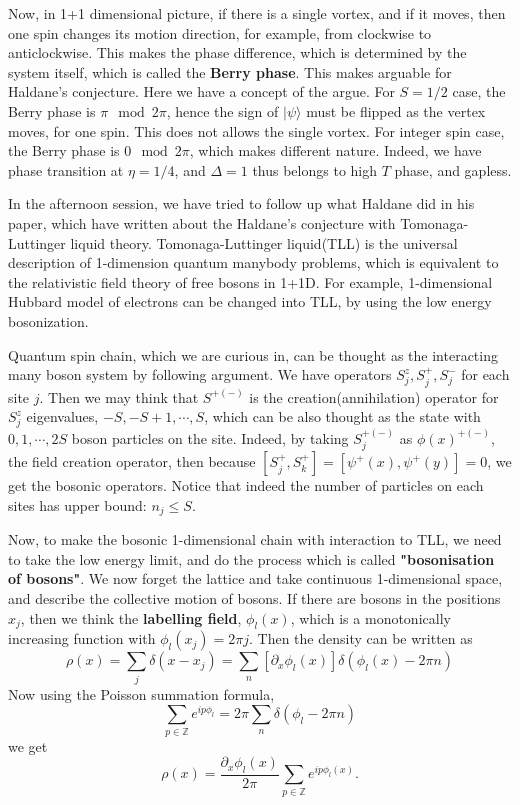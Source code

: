 Now, in 1+1 dimensional picture, if there is a single vortex, and if it moves, then one spin changes its motion direction, for example, from clockwise to anticlockwise. This makes the phase difference, which is determined by the system itself, which is called the \textbf{Berry phase}. This makes arguable for Haldane's conjecture. Here we have a concept of the argue. For $S=1/2$ case, the Berry phase is $\pi \mod 2\pi$, hence the sign of $|\psi\rangle$ must be flipped as the vertex moves, for one spin. This does not allows the single vortex. For integer spin case, the Berry phase is $0 \mod 2\pi$, which makes different nature. Indeed, we have phase transition at $\eta=1/4$, and $\Delta=1$ thus belongs to high $T$ phase, and gapless.

In the afternoon session, we have tried to follow up what Haldane did in his paper, which have written about the Haldane's conjecture with Tomonaga-Luttinger liquid theory. Tomonaga-Luttinger liquid(TLL) is the universal description of 1-dimension quantum manybody problems, which is equivalent to the relativistic field theory of free bosons in 1+1D. For example, 1-dimensional Hubbard model of electrons can be changed into TLL, by using the low energy bosonization.

Quantum spin chain, which we are curious in, can be thought as the interacting many boson system by following argument. We have operators $S_j^z, S_j^+, S_j^-$ for each site $j$. Then we may think that $S^{+(-)}$ is the creation(annihilation) operator for $S_j^z$ eigenvalues, $-S, -S+1,\cdots,S$, which can be also thought as the state with $0,1,\cdots,2S$ boson particles on the site. Indeed, by taking $S_j^{+(-)}$ as $\phi(x)^{+(-)}$, the field creation operator, then because $[S_j^+,S_k^+]=[\psi^+(x),\psi^+(y)]=0$, we get the bosonic operators. Notice that indeed the number of particles on each sites has upper bound: $n_j\leq S$.

Now, to make the bosonic 1-dimensional chain with interaction to TLL, we need to take the low energy limit, and do the process which is called \textbf{"bosonisation of bosons"}. We now forget the lattice and take continuous 1-dimensional space, and describe the collective motion of bosons. If there are bosons in the positions $x_j$, then we think the \textbf{labelling field}, $\phi_l(x)$, which is a monotonically increasing function with $\phi_l(x_j)=2\pi j$. Then the density can be written as
\begin{equation}
\rho(x)=\sum_j \delta(x-x_j)=\sum_n \left[\partial_x \phi_l(x)\right]\delta(\phi_l(x)-2\pi n)
\end{equation}
Now using the Poisson summation formula,
\begin{equation}
\sum_{p\in\mathbb{Z}}e^{ip\phi_l}=2\pi\sum_n \delta(\phi_l-2\pi n)
\end{equation}
we get
\begin{equation}
\rho(x)=\frac{\partial_x \phi_l(x)}{2\pi}\sum_{p\in \mathbb{Z}}e^{ip\phi_l(x)}.
\end{equation}

